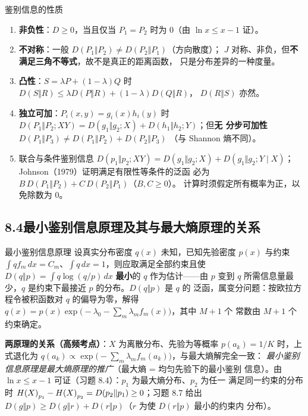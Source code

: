 \begin{thmbox}{鉴别信息的性质}
\begin{enumerate}[leftmargin=1.5em,itemsep=1pt,topsep=2pt]
\item \textbf{非负性}：$D\ge0$，当且仅当 $P_1=P_2$ 时为 0（由
      $\ln x\le x-1$ 证）。
\item \textbf{不对称}：一般 $D(P_1\Vert P_2)\neq D(P_2\Vert P_1)$（方向散度）；
      $J$ 对称、非负，但\textbf{不满足三角不等式}，故不是真正的距离函数，
      只是分布差异的一种度量。
\item \textbf{凸性}：$S=\lambda P+(1-\lambda)Q$ 时
      $D(S\Vert R)\le\lambda D(P\Vert R)+(1-\lambda)D(Q\Vert R)$，
      $D(R\Vert S)$ 亦然。
\item \textbf{独立可加}：$P_i(x,y)=g_i(x)h_i(y)$ 时
      $D(P_1\Vert P_2;XY)=D(g_1\Vert g_2;X)+D(h_1\Vert h_2;Y)$；但\textbf{无
      分步可加性} $D(P_1\Vert P_3)\neq D(P_1\Vert P_2)+D(P_2\Vert P_3)$
      （与 Shannon 熵不同）。
\item 联合与条件鉴别信息 $D(p_1\Vert p_2;XY)=D(g_1\Vert g_2;X)+
      D(g_1\Vert g_2;Y\mid X)$；Johnson（1979）证明满足有限性等条件的泛函
      必为 $B\,D(P_1\Vert P_2)+C\,D(P_2\Vert P_1)$（$B,C\ge0$）。
      计算时须假定所有概率为正，以免除数为 0。
\end{enumerate}
\end{thmbox}

\subsection{8.4\quad 最小鉴别信息原理及其与最大熵原理的关系}

\begin{defbox}{最小鉴别信息原理}
设真实分布密度 $q(x)$ 未知，已知先验密度 $p(x)$ 与约束
$\int qf_m\,dx=C_m$、$\int q\,dx=1$，则应取满足全部约束且使
$D(q\Vert p)=\int q\log(q/p)\,dx$ \textbf{最小}的 $q$ 作为估计——由 $p$ 变到
$q$ 所需信息量最少，$q$ 是约束下最接近 $p$ 的分布。$D(q\Vert p)$ 是 $q$ 的
泛函，属变分问题：按欧拉方程令被积函数对 $q$ 的偏导为零，解得
$q(x)=p(x)\exp\bigl(-\lambda_0-\sum_m\lambda_mf_m(x)\bigr)$，其中 $M+1$ 个
常数由 $M+1$ 个约束确定。
\end{defbox}

\textbf{两原理的关系（高频考点）}：$X$ 为离散分布、先验为等概率
$p(a_k)=1/K$ 时，上式退化为
$q(a_k)\propto\exp\bigl(-\sum_m\lambda_mf_m(a_k)\bigr)$，与最大熵解完全一致：
\emph{最小鉴别信息原理是最大熵原理的推广}（最大熵 = 均匀先验下的最小鉴别
信息）。由 $\ln x\le x-1$ 可证（习题 8.4）：$p_1$ 为最大熵分布、$p_2$ 为任一
满足同一约束的分布时
$H\!\left(X\right)_{p_1}-H\!\left(X\right)_{p_2}=D(p_2\Vert p_1)\ge0$；习题 8.7 给出
$D(g\Vert p)\ge D(g\Vert r)+D(r\Vert p)$（$r$ 为使 $D(r\Vert p)$ 最小的约束内
分布）。

